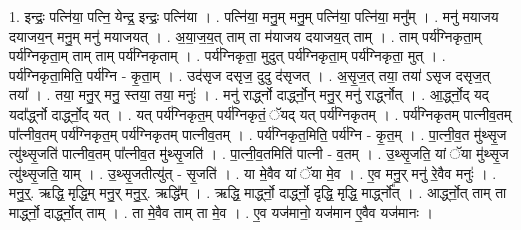 \documentclass[17pt]{extarticle}
\begin{document}
1. इन्द्रः॒ पत्नि॑या॒ पत्नि॒ येन्द्र॒ इन्द्रः॒ पत्नि॑या । . पत्नि॑या॒ मनु॒म् मनु॒म् पत्नि॑या॒ पत्नि॑या॒ मनु᳚म् । . मनु॑ मयाजय दयाजय॒न् मनु॒म् मनु॑ मयाजयत् । . अ॒या॒ज॒य॒त् ताम् ता म॑याजय दयाजय॒त् ताम् । . ताम् पर्य॑ग्निकृता॒म् पर्य॑ग्निकृता॒म् ताम् ताम् पर्य॑ग्निकृताम् । . पर्य॑ग्निकृता॒ मुदुत् पर्य॑ग्निकृता॒म् पर्य॑ग्निकृता॒ मुत् । . पर्य॑ग्निकृता॒मिति॒ पर्य॑ग्नि - कृ॒ता॒म् । . उद॑सृज दसृज॒ दुदु द॑सृजत् । . अ॒सृ॒ज॒त् तया॒ तया॑ ऽसृज दसृज॒त् तया᳚ । . तया॒ मनु॒र् मनु॒ स्तया॒ तया॒ मनुः॑ । . मनु॑ रार्द्ध्नो दार्द्ध्नो॒न् मनु॒र् मनु॑ रार्द्ध्नोत् । . आ॒र्द्ध्नो॒द् यद् यदा᳚र्द्ध्नो दार्द्ध्नो॒द् यत् । . यत् पर्य॑ग्निकृत॒म् पर्य॑ग्निकृतं॒ ॅयद् यत् पर्य॑ग्निकृतम् । . पर्य॑ग्निकृतम् पात्नीव॒तम् पा᳚त्नीव॒तम् पर्य॑ग्निकृत॒म् पर्य॑ग्निकृतम् पात्नीव॒तम् । . पर्य॑ग्निकृत॒मिति॒ पर्य॑ग्नि - कृ॒त॒म् । . पा॒त्नी॒व॒त मु॑थ्सृ॒ज त्यु॑थ्सृ॒जति॑ पात्नीव॒तम् पा᳚त्नीव॒त मु॑थ्सृ॒जति॑ । . पा॒त्नी॒व॒तमिति॑ पात्नी - व॒तम् । . उ॒थ्सृ॒जति॒ यां ॅया मु॑थ्सृ॒ज त्यु॑थ्सृ॒जति॒ याम् । . उ॒थ्सृ॒जतीत्यु॑त् - सृ॒जति॑ । . या मे॒वैव यां ॅया मे॒व । . ए॒व मनु॒र् मनु॑ रे॒वैव मनुः॑ । . मनु॒र्॒. ऋद्धि॒ मृद्धि॒म् मनु॒र् मनु॒र्॒. ऋद्धि᳚म् । . ऋद्धि॒ मार्द्ध्नो॒ दार्द्ध्नो॒ दृद्धि॒ मृद्धि॒ मार्द्ध्नो᳚त् । . आर्द्ध्नो॒त् ताम् ता मार्द्ध्नो॒ दार्द्ध्नो॒त् ताम् । . ता मे॒वैव ताम् ता मे॒व । . ए॒व यज॑मानो॒ यज॑मान ए॒वैव यज॑मानः । \newline
\end{document}
